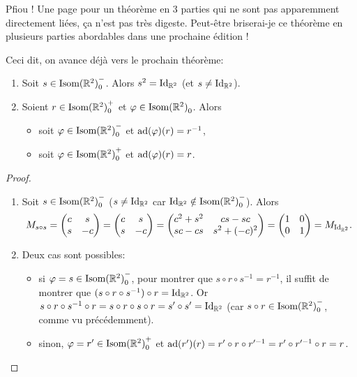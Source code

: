 \documentclass{book}
\numberwithin{equation}{section}
\renewcommand{\phi}{\varphi}
\providecommand{\plan}{{\mathbb R^2}}
\providecommand{\id}{{\textnormal{Id}}}
\providecommand{\IdR}{{\id_\plan}}
\providecommand{\isom}{{\textnormal{Isom}(\plan)}}
\providecommand{\isomo}{{\isom_0}}
\providecommand{\isomop}{\isom_0^+}
\providecommand{\isomom}{\isom_0^-}
\providecommand{\ad}{{\textnormal{ad}}}
\begin{document}
Pfiou ! Une page pour un théorème en 3 parties qui ne sont pas apparemment directement liées, ça n'est pas très digeste. Peut-être briserai-je ce théorème en plusieurs parties abordables dans une prochaine édition ! \par
Ceci dit, on avance déjà vers le prochain théorème:

\begin{thm}
	\begin{enumerate}
		\item Soit $s \in \isomom$. Alors $s^2 = \IdR$ (et $s \neq \IdR$).	
		\item Soient $r \in \isomop$ et $\phi \in \isomo$. Alors 
		\begin{itemize}
			\item soit $\phi \in \isomom$ et $\ad(\phi)(r) = r^{-1}$,
			\item soit $\phi \in \isomop$ et $\ad(\phi)(r) = r$.
		\end{itemize}
	\end{enumerate}
\end{thm}
\begin{proof}
	\begin{enumerate}
	 	\item Soit $s \in \isomom$ ($s \neq \IdR$ car $\IdR \notin \isomom$). Alors
	 	\begin{equation*}
	 		M_{s \circ s} = \begin{pmatrix}
	 			c&s\\s&-c
	 		\end{pmatrix} = \begin{pmatrix}
	 			c&s\\s&-c
	 		\end{pmatrix} = \begin{pmatrix}
	 			c^2 + s^2 & cs - sc \\
	 			sc - cs & s^2 + (-c)^2
	 		\end{pmatrix} = \begin{pmatrix}
	 			1&0\\0&1
	 		\end{pmatrix}
	 		= M_\IdR.
	 	\end{equation*}
	 	\item Deux cas sont possibles:
	 	\begin{itemize}
	 		\item si $\phi = s \in \isomom$, pour montrer que $s \circ r \circ s^{-1} = r^{-1}$, il suffit de montrer que $(s \circ r \circ s^{-1}) \circ r = \IdR$. Or $s \circ r \circ s^{-1} \circ r = s \circ r \circ s \circ r = s' \circ s' = \IdR$ (car $s \circ r \in \isomom$, comme vu précédemment).
	 		\item sinon, $\phi = r' \in \isomop$ et $\ad(r')(r) = r' \circ r \circ r'^{-1} = r' \circ r'^{-1} \circ r = r$.
	 	\end{itemize}
	\end{enumerate}
\end{proof}
\end{document}
